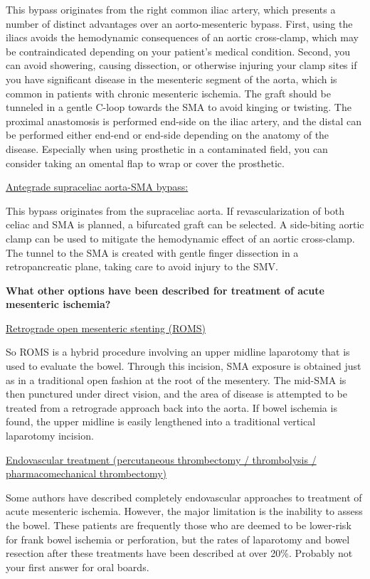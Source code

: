 \documentclass[
]{book}
\begin{document}
This bypass originates from the right common iliac artery, which
presents a number of distinct advantages over an aorto-mesenteric
bypass. First, using the iliacs avoids the hemodynamic consequences of
an aortic cross-clamp, which may be contraindicated depending on your
patient's medical condition. Second, you can avoid showering, causing
dissection, or otherwise injuring your clamp sites if you have
significant disease in the mesenteric segment of the aorta, which is
common in patients with chronic mesenteric ischemia. The graft should be
tunneled in a gentle C-loop towards the SMA to avoid kinging or
twisting. The proximal anastomosis is performed end-side on the iliac
artery, and the distal can be performed either end-end or end-side
depending on the anatomy of the disease. Especially when using
prosthetic in a contaminated field, you can consider taking an omental
flap to wrap or cover the prosthetic.

\uline{Antegrade supraceliac aorta-SMA bypass:}

This bypass originates from the supraceliac aorta. If revascularization
of both celiac and SMA is planned, a bifurcated graft can be selected. A
side-biting aortic clamp can be used to mitigate the hemodynamic effect
of an aortic cross-clamp. The tunnel to the SMA is created with gentle
finger dissection in a retropancreatic plane, taking care to avoid
injury to the SMV.

\textbf{What other options have been described for treatment of acute
mesenteric ischemia?}

\uline{Retrograde open mesenteric stenting (ROMS)}

So ROMS is a hybrid procedure involving an upper midline laparotomy that
is used to evaluate the bowel. Through this incision, SMA exposure is
obtained just as in a traditional open fashion at the root of the
mesentery. The mid-SMA is then punctured under direct vision, and the
area of disease is attempted to be treated from a retrograde approach
back into the aorta. If bowel ischemia is found, the upper midline is
easily lengthened into a traditional vertical laparotomy incision.

\uline{Endovascular treatment (percutaneous thrombectomy / thrombolysis /
pharmacomechanical thrombectomy)}

Some authors have described completely endovascular approaches to
treatment of acute mesenteric ischemia. However, the major limitation is
the inability to assess the bowel. These patients are frequently those
who are deemed to be lower-risk for frank bowel ischemia or perforation,
but the rates of laparotomy and bowel resection after these treatments
have been described at over 20\%. Probably not your first answer for oral
boards.
\end{document}
